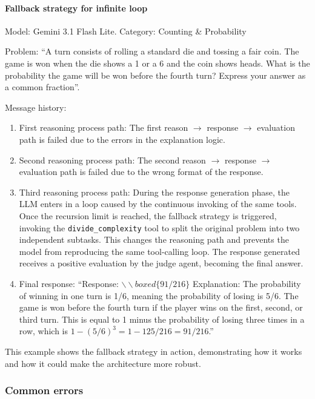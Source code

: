 \documentclass[12pt,a4paper,openright,twoside]{book}
\begin{document}
\paragraph{Fallback strategy for infinite loop}{Model: Gemini 3.1 Flash Lite. Category: Counting \& Probability

Problem: ``A turn consists of rolling a standard die and tossing a fair coin. The game is won when the die shows a 1 or a 6 and the coin shows heads. 
What is the probability the game will be won before the fourth turn? Express your answer as a common fraction''.

Message history:
\begin{enumerate}
    \item First reasoning process path: The first reason $\rightarrow$ response $\rightarrow$ evaluation path is failed due to the errors in the explanation logic.
    \item Second reasoning process path: The second reason $\rightarrow$ response $\rightarrow$ evaluation path is failed due to the wrong format of the response.
    \item Third reasoning process path: During the response generation phase, the \ac{LLM} enters in a loop caused by the continuous invoking of the same tools.
    Once the recursion limit is reached, the fallback strategy is triggered, invoking the \texttt{divide\_complexity} tool to split the original problem into two independent subtasks. 
    This changes the reasoning path and prevents the model from reproducing the same tool-calling loop. 
    The response generated receives a positive evaluation by the judge agent, becoming the final answer.
    \item Final response: ``Response: $\backslash\backslash boxed\{91/216\}$ Explanation: The probability of winning in one turn is 1/6, meaning the probability of losing is 5/6. The game is won before the fourth turn if the player wins on the first, second, or third turn. This is equal to 1 minus the probability of losing three times in a row, which is $1 - (5/6)^3 = 1 - 125/216 = 91/216$.''
\end{enumerate}
This example shows the fallback strategy in action, demonstrating how it works and how it could make the architecture more robust.
}


\subsubsection{Common errors}
\end{document}
